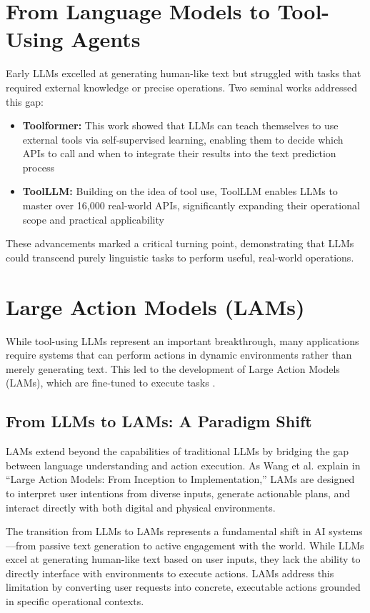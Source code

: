 \documentclass[journal,twoside,10pt]{IEEEtran}
\begin{document}
\section{From Language Models to Tool-Using Agents}
Early LLMs excelled at generating human-like text but struggled with tasks that required external knowledge or precise operations. Two seminal works addressed this gap:

\begin{itemize}
    \item \textbf{Toolformer:} This work showed that LLMs can teach themselves to use external tools via self-supervised learning, enabling them to decide which APIs to call and when to integrate their results into the text prediction process \cite{toolformer2023}
    \item \textbf{ToolLLM:} Building on the idea of tool use, ToolLLM enables LLMs to master over 16,000 real-world APIs, significantly expanding their operational scope and practical applicability \cite{toolllm2023}
\end{itemize}

These advancements marked a critical turning point, demonstrating that LLMs could transcend purely linguistic tasks to perform useful, real-world operations.

\section{Large Action Models (LAMs)}
While tool-using LLMs represent an important breakthrough, many applications require systems that can perform actions in dynamic environments rather than merely generating text. This led to the development of Large Action Models (LAMs), which are fine-tuned to execute tasks \cite{wang2023lam}.

\subsection{From LLMs to LAMs: A Paradigm Shift}
LAMs extend beyond the capabilities of traditional LLMs by bridging the gap between language understanding and action execution. As Wang et al. explain in ``Large Action Models: From Inception to Implementation,'' LAMs are designed to interpret user intentions from diverse inputs, generate actionable plans, and interact directly with both digital and physical environments.

The transition from LLMs to LAMs represents a fundamental shift in AI systems—from passive text generation to active engagement with the world. While LLMs excel at generating human-like text based on user inputs, they lack the ability to directly interface with environments to execute actions. LAMs address this limitation by converting user requests into concrete, executable actions grounded in specific operational contexts.
\end{document}
